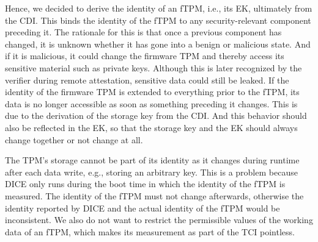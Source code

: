 Hence, we decided to derive the identity of an fTPM, i.e., its \ac{EK}, ultimately from the CDI\@.
This binds the identity of the fTPM to any security-relevant component preceding it.
The rationale for this is that once a previous component has changed, it is unknown whether it has gone into a benign or malicious state.
And if it is malicious, it could change the firmware TPM and thereby access its sensitive material such as private keys.
Although this is later recognized by the verifier during remote attestation, sensitive data could still be leaked.
If the identity of the firmware TPM is extended to everything prior to the fTPM, its data is no longer accessible as soon as something preceding it changes.
This is due to the derivation of the storage key from the CDI\@.
And this behavior should also be reflected in the EK, so that the storage key and the EK should always change together or not change at all.

The TPM's storage cannot be part of its identity as it changes during runtime after each data write, e.g., storing an arbitrary key.
This is a problem because DICE only runs during the boot time in which the identity of the fTPM is measured.
The identity of the fTPM must not change afterwards, otherwise the identity reported by DICE and the actual identity of the fTPM would be inconsistent.
We also do not want to restrict the permissible values of the working data of an fTPM, which makes its measurement as part of the TCI pointless.


